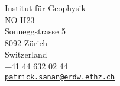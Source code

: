{\small Institut f\"{u}r Geophysik\\NO H23\\Sonneggstrasse 5\\8092 Z\"{u}rich\\Switzerland}\\
{+41 44 632 02 44} \\
\vspace{5pt}
{\tt \href{mailto:patrick.sanan@gmail.com}{patrick.sanan@erdw.ethz.ch}}\\
